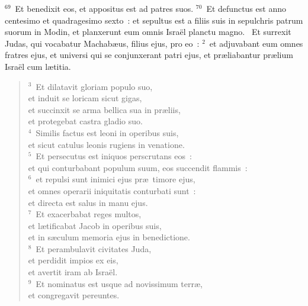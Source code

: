 ${}^{69}$~Et benedixit eos, et appositus est ad patres suos.
${}^{70}$~Et defunctus est anno centesimo et quadragesimo sexto~: et sepultus est a filiis suis in sepulchris patrum suorum in Modin, et planxerunt eum omnis Isra\"el planctu magno.
~\lettrine[lines=10,image=true,loversize=0.05,lraise=-0.03]{E}{}t surrexit Judas, qui vocabatur Machab\ae us, filius ejus, pro eo~:
${}^{2}$~et adjuvabant eum omnes fratres ejus, et universi qui se conjunxerant patri ejus, et pr\ae liabantur pr\ae lium Isra\"el cum l\ae titia.
\begin{flushleft}\begin{verse}${}^{3}$~Et dilatavit gloriam populo suo,\\ et induit se loricam sicut gigas,\\ et succinxit se arma bellica sua in pr\ae liis,\\ et protegebat castra gladio suo.\\
${}^{4}$~Similis factus est leoni in operibus suis,\\ et sicut catulus leonis rugiens in venatione.\\
${}^{5}$~Et persecutus est iniquos perscrutans eos~:\\ et qui conturbabant populum suum, eos succendit flammis~:\\
${}^{6}$~et repulsi sunt inimici ejus pr\ae\ timore ejus,\\ et omnes operarii iniquitatis conturbati sunt~:\\ et directa est salus in manu ejus.\\
${}^{7}$~Et exacerbabat reges multos,\\ et l\ae tificabat Jacob in operibus suis,\\ et in s\ae culum memoria ejus in benedictione.\\
${}^{8}$~Et perambulavit civitates Juda,\\ et perdidit impios ex eis,\\ et avertit iram ab Isra\"el.\\
${}^{9}$~Et nominatus est usque ad novissimum terr\ae ,\\ et congregavit pereuntes.\end{verse}\end{flushleft}


